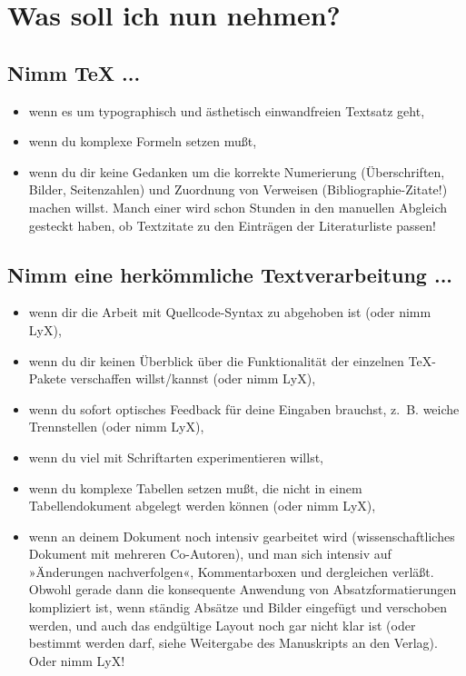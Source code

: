 \documentclass[11pt,a4paper,ngerman,DIV=8]{scrartcl}
\begin{document}
\section{Was soll ich nun nehmen?}

\subsection{Nimm \TeX{} ...}

\begin{itemize}
  \item wenn es um typographisch und ästhetisch einwandfreien Textsatz geht,
  \item wenn du komplexe Formeln setzen mußt,
  \item wenn du dir keine Gedanken um die korrekte Numerierung (Überschriften, Bilder, Seitenzahlen) und Zuordnung von Verweisen (Bibliographie-Zitate!) machen willst. Manch einer wird schon Stunden in den manuellen Abgleich gesteckt haben, ob Textzitate zu den Einträgen der Literaturliste passen!
\end{itemize}

\subsection{Nimm eine herkömmliche Textverarbeitung ...}

\begin{itemize}
  \item wenn dir die Arbeit mit Quellcode-Syntax zu abgehoben ist (oder nimm LyX),
  \item wenn du dir keinen Überblick über die Funktionalität der einzelnen \TeX{}-Pakete
verschaffen willst/kannst (oder nimm LyX),
  \item wenn du sofort optisches Feedback für deine Eingaben brauchst, z.~B. weiche
Trennstellen (oder nimm LyX),
\item wenn du viel mit Schriftarten experimentieren willst,
\item wenn du komplexe Tabellen setzen mußt, die nicht in einem Tabellendokument
abgelegt werden können (oder nimm LyX),
\item wenn an deinem Dokument noch intensiv gearbeitet wird (wissenschaftliches Dokument mit mehreren Co-Autoren), und man sich intensiv auf »Änderungen nachverfolgen«, Kommentarboxen und dergleichen verläßt. Obwohl gerade dann die konsequente Anwendung von Absatzformatierungen kompliziert ist\footnotemark{}, wenn ständig Absätze und Bilder eingefügt und verschoben werden, und auch das endgültige Layout noch gar nicht klar ist (oder bestimmt werden darf, siehe Weitergabe des Manuskripts an den Verlag). Oder nimm LyX!
\end{itemize}

\end{document}
